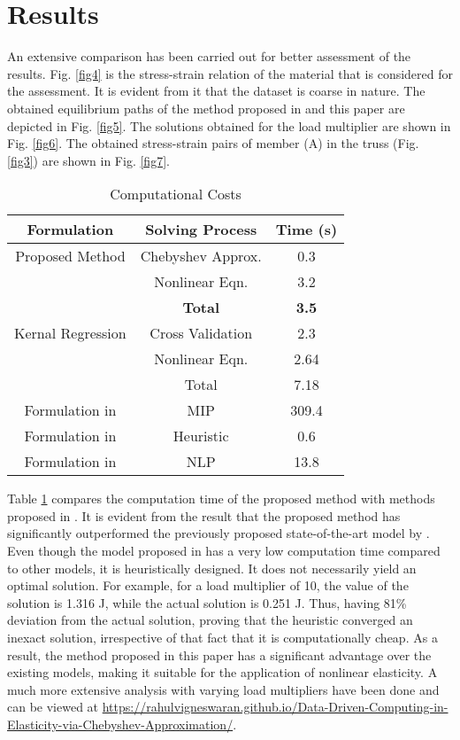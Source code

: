 \documentclass[conference]{IEEEtran}
\begin{document}
\section{Results}
\label{results}
An extensive comparison has been carried out for better assessment of the results. Fig. \ref{fig4} is the stress-strain relation of the material that is considered for the assessment. It is evident from it that the dataset is coarse in nature. The obtained equilibrium paths of the method proposed in \cite{26} and this paper are depicted in Fig. \ref{fig5}. The solutions obtained for the load multiplier  are shown in Fig. \ref{fig6}. The obtained stress-strain pairs of member (A) in the truss (Fig. \ref{fig3}) are shown in Fig. \ref{fig7}.

\begin{table}[]
\centering
\caption{Computational Costs}
\begin{tabular}{|c|c|c|}
\hline
\textbf{Formulation} & \textbf{Solving Process} & \textbf{Time (s)} \\ \hline
Proposed Method & Chebyshev Approx. & 0.3 \\ \hline
 & Nonlinear Eqn. & 3.2 \\ \hline
 & \textbf{Total} & \textbf{3.5} \\ \hline
Kernal Regression \cite{26} & Cross Validation & 2.3 \\ \hline
 & Nonlinear Eqn. & 2.64 \\ \hline
 & Total & 7.18 \\ \hline
Formulation in  \cite{14} & MIP \cite{24} & 309.4 \\ \hline
Formulation in \cite{14} & Heuristic \cite{14} & 0.6 \\ \hline
Formulation in \cite{15} & NLP & 13.8 \\ \hline
\end{tabular}

\label{tab1}
\end{table}

Table \ref{tab1} compares the computation time of the proposed method with methods proposed in \cite{14,15,24,16}. It is evident from the result that the proposed method has significantly outperformed the previously proposed state-of-the-art model by . Even though the model proposed in \cite{14} has a very low computation time compared to other models, it is heuristically designed. It does not necessarily yield an optimal solution. For example, for a load multiplier of 10, the value of the solution is 1.316 J, while the actual solution is 0.251 J. Thus, having 81\% deviation from the actual solution, proving that the heuristic converged an inexact solution, irrespective of that fact that it is computationally cheap. As a result, the method proposed in this paper has a significant advantage over the existing models, making it suitable for the application of nonlinear elasticity. A much more extensive analysis with varying load multipliers have been done and can be viewed at \href{https://rahulvigneswaran.github.io/Data-Driven-Computing-in-Elasticity-via-Chebyshev-Approximation/}{https://rahulvigneswaran.github.io/Data-Driven-Computing-in-Elasticity-via-Chebyshev-Approximation/}. 
\end{document}
